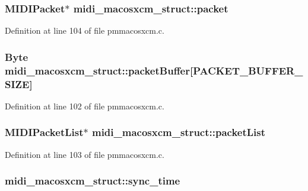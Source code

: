 \subsubsection[{\texorpdfstring{packet}{packet}}]{\setlength{\rightskip}{0pt plus 5cm}M\+I\+D\+I\+Packet$\ast$ midi\+\_\+macosxcm\+\_\+struct\+::packet}\hypertarget{structmidi__macosxcm__struct_afaacc33d2072c0c58e110487f2d9442f}{}\label{structmidi__macosxcm__struct_afaacc33d2072c0c58e110487f2d9442f}


Definition at line 104 of file pmmacosxcm.\+c.

\subsubsection[{\texorpdfstring{packet\+Buffer}{packetBuffer}}]{\setlength{\rightskip}{0pt plus 5cm}Byte midi\+\_\+macosxcm\+\_\+struct\+::packet\+Buffer\mbox{[}{\bf P\+A\+C\+K\+E\+T\+\_\+\+B\+U\+F\+F\+E\+R\+\_\+\+S\+I\+ZE}\mbox{]}}\hypertarget{structmidi__macosxcm__struct_a0f23c8779a1b2890e657bfaf0dfcc462}{}\label{structmidi__macosxcm__struct_a0f23c8779a1b2890e657bfaf0dfcc462}


Definition at line 102 of file pmmacosxcm.\+c.

\subsubsection[{\texorpdfstring{packet\+List}{packetList}}]{\setlength{\rightskip}{0pt plus 5cm}M\+I\+D\+I\+Packet\+List$\ast$ midi\+\_\+macosxcm\+\_\+struct\+::packet\+List}\hypertarget{structmidi__macosxcm__struct_ac5176780d36fd79cf257c95f5e51a40e}{}\label{structmidi__macosxcm__struct_ac5176780d36fd79cf257c95f5e51a40e}


Definition at line 103 of file pmmacosxcm.\+c.

\subsubsection[{\texorpdfstring{sync\+\_\+time}{sync_time}}]{ midi\+\_\+macosxcm\+\_\+struct\+::sync\+\_\+time}\hypertarget{structmidi__macosxcm__struct_a4076d731df5c15cebcf3df7f60d9df3c}{}\label{structmidi__macosxcm__struct_a4076d731df5c15cebcf3df7f60d9df3c}


